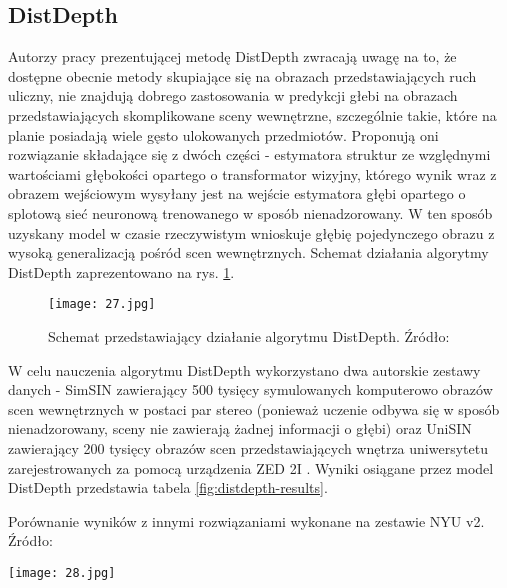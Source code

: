 \subsection{DistDepth}
Autorzy pracy prezentującej metodę DistDepth \cite{wu2022practical} zwracają uwagę na to, że dostępne obecnie metody skupiające się na obrazach przedstawiających ruch uliczny, nie znajdują dobrego zastosowania w predykcji głebi na obrazach przedstawiających skomplikowane sceny wewnętrzne, szczególnie takie, które na planie posiadają wiele gęsto ulokowanych przedmiotów. Proponują oni rozwiązanie składające się z dwóch części - estymatora struktur ze względnymi wartościami głębokości opartego o transformator wizyjny, którego wynik wraz z obrazem wejściowym wysyłany jest na wejście estymatora głębi opartego o splotową sieć neuronową trenowanego w sposób nienadzorowany. W ten sposób uzyskany model w czasie rzeczywistym wnioskuje głębię pojedynczego obrazu z wysoką generalizacją pośród scen wewnętrznych. Schemat działania algorytmy DistDepth zaprezentowano na rys. \ref{fig:distdepth-teaser}.
\begin{figure}[H]
    \centering
    \texttt{[image: 27.jpg]}
    \caption{Schemat przedstawiający działanie algorytmu DistDepth. Źródło: \cite{wu2022practical}}
    \label{fig:distdepth-teaser}
\end{figure}
W celu nauczenia algorytmu DistDepth wykorzystano dwa autorskie zestawy danych - SimSIN zawierający 500 tysięcy symulowanych komputerowo obrazów scen wewnętrznych w postaci par stereo (ponieważ uczenie odbywa się w sposób nienadzorowany, sceny nie zawierają żadnej informacji o głębi) oraz UniSIN zawierający 200 tysięcy obrazów scen przedstawiających wnętrza uniwersytetu zarejestrowanych za pomocą urządzenia ZED 2I \cite{ZED2I}. Wyniki osiągane przez model DistDepth przedstawia tabela \ref{fig:distdepth-results}.
\begin{table}[H]
    \centering
    \caption{Porównanie wyników z innymi rozwiązaniami wykonane na zestawie NYU v2. Źródło: \cite{wu2022practical}}
    \texttt{[image: 28.jpg]}
    \label{fig:distdepth-results}
\end{table}

